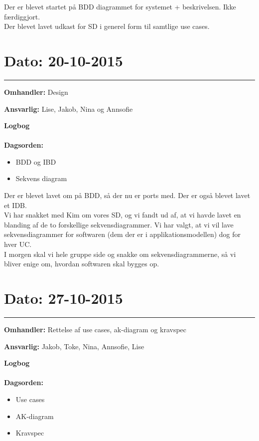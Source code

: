 Der er blevet startet på BDD diagrammet for systemet + beskrivelsen. Ikke færdiggjort.\\
Der blevet lavet udkast for SD i generel form til samtlige use cases. 




\section{Dato: 20-10-2015 }
\hrule

\textbf{Omhandler:} Design 

\textbf{Ansvarlig:} Lise, Jakob, Nina og Annsofie

\textbf{Logbog}
\\
\\
\textbf{Dagsorden:}
\begin{itemize}
	\item BDD og IBD
	\item Sekvens diagram
\end{itemize}

Der er blevet lavet om på BDD, så der nu er ports med. Der er også blevet lavet et IDB. 
\\
Vi har snakket med Kim om vores SD, og vi fandt ud af, at vi havde lavet en blanding af de to forskellige sekvensdiagrammer. Vi har valgt, at vi vil lave sekvensdiagrammer for softwaren (dem der er i applikationsmodellen) dog for hver UC.
\\
I morgen skal vi hele gruppe side og snakke om sekvensdiagrammerne, så vi bliver enige om, hvordan softwaren skal bygges op.  
	
	
	

\section{Dato: 27-10-2015 }
\hrule

\textbf{Omhandler:} Rettelse af use cases, ak-diagram og kravspec

\textbf{Ansvarlig:} Jakob, Toke, Nina, Annsofie, Lise 

\textbf{Logbog}
\\
\\
\textbf{Dagsorden:}
\begin{itemize}
	\item Use cases
	\item AK-diagram
	\item Kravspec
\end{itemize}

